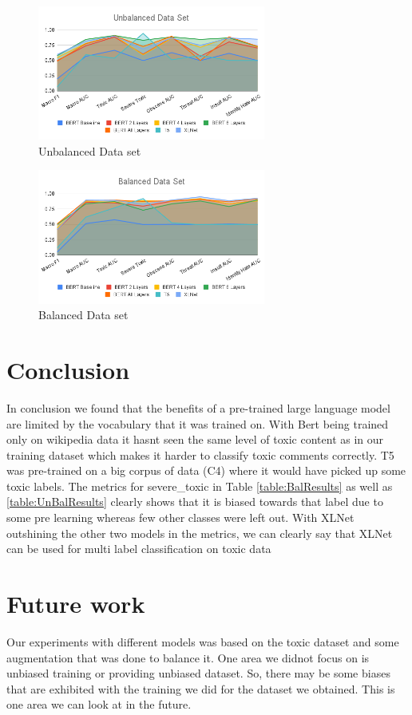 \documentclass[11pt,a4paper]{article}
\begin{document}
\begin{figure}[]
\centering
\includegraphics[width=75mm,scale=0.5]{Unbalanced Data Set.png}
\caption{Unbalanced Data set}
\label{UnbalancedData}
\end{figure}

\begin{figure}[]
\centering
\includegraphics[width=75mm,scale=0.5]{Balanced Data Set.png}
\caption{Balanced Data set}
\label{BalancedData}
\end{figure}
\FloatBarrier

\section{Conclusion}
In conclusion we found that the benefits of a pre-trained large language model are limited by the vocabulary that it was trained on. With Bert being trained only on wikipedia data it hasnt seen the same level of toxic content as in our training dataset which makes it harder to classify toxic comments correctly.
T5 was pre-trained on a big corpus of data (C4) where it would have picked up some toxic labels. The metrics for severe\_toxic in Table \ref{table:BalResults} as well as \ref{table:UnBalResults} clearly shows that it is biased towards that label due to some pre learning whereas few other classes were left out.
With XLNet outshining the other two models in the metrics, we can clearly say that XLNet can be used for multi label classification on toxic data

\section{Future work}
Our experiments with different models was based on the toxic dataset and some augmentation that was done to balance it. One area we didnot focus on is unbiased training or providing unbiased dataset. So, there may be some biases that are exhibited with the training we did for the dataset we obtained. This is one area we can look at in the future.



\end{document}
